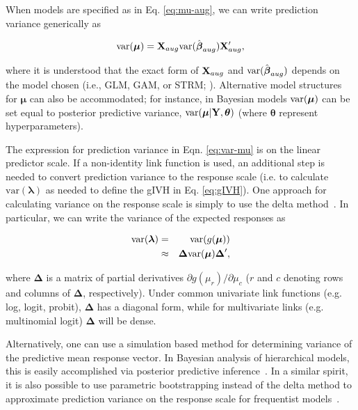 \documentclass[10pt,letterpaper]{article}
\begin{document}
When models are specified as in Eq. \ref{eq:mu-aug}, we can write prediction variance generically as
\begin{linenomath*}
\begin{equation}
  \label{eq:var-mu}
  {\rm var}(\boldsymbol{\mu})= {\bf X}_{aug} {\rm var}(\hat{\boldsymbol{\beta}}_{aug}) {\bf X}_{aug}^\prime,
\end{equation}
\end{linenomath*}
where it is understood that the exact form of ${\bf X}_{aug}$ and ${\rm var}(\hat{\boldsymbol{\beta}}_{aug})$ depends on the model chosen (i.e., GLM, GAM, or STRM; ). Alternative model structures for $\boldsymbol{\mu}$ can also be accommodated; for instance, in Bayesian models ${\rm var}(\boldsymbol{\mu})$ can be set equal to posterior predictive variance, $\textrm{var}(\boldsymbol{\mu}|{\bf Y},\boldsymbol{\theta})$ (where $\boldsymbol{\theta}$ represent hyperparameters).

The expression for prediction variance in Eqn. \ref{eq:var-mu} is on the linear predictor scale.  If a non-identity link function is used, an additional step is needed to convert prediction variance to the response scale (i.e.  to calculate $\textrm{var}(\boldsymbol{\lambda})$ as needed to define the gIVH in Eq. \ref{eq:gIVH}).  One approach for calculating variance on the response scale is simply to use the delta method~\cite{Dorfman1938,VerHoef2012b}.  In particular, we can write the variance of the expected responses as
\begin{linenomath*}
\begin{eqnarray}
  \label{eq:var-lambda}
  {\rm var}(\boldsymbol{\lambda}) & = & {\rm var}(g(\boldsymbol{\mu})) \nonumber \\
  & \approx & \boldsymbol{\Delta} {\rm var}(\boldsymbol{\mu})\boldsymbol{\Delta}^\prime,
\end{eqnarray}
\end{linenomath*}
where $\boldsymbol{\Delta}$ is a matrix of partial derivatives $\partial g(\mu_r)/\partial \mu_c$ ($r$ and $c$ denoting rows and columns of $\boldsymbol{\Delta}$, respectively).  Under common univariate link functions (e.g. log, logit, probit), $\boldsymbol{\Delta}$ has a diagonal form, while for multivariate links (e.g. multinomial logit) $\boldsymbol{\Delta}$ will be dense.  

Alternatively, one can use a simulation based method for determining variance of the predictive mean response vector.  In Bayesian analysis of hierarchical models, this is easily accomplished via posterior predictive inference~\cite{Gelman2004}.  In a similar spirit, it is also possible to use parametric bootstrapping instead of the delta method to approximate prediction variance on the response scale for frequentist models~\cite{MarraEtAl2012,AugustinEtAl2013,MillerEtAl2013}.  
\end{document}
